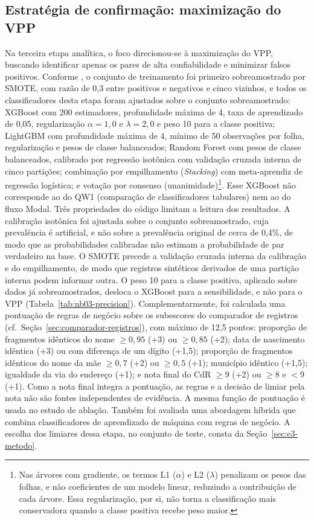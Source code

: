 \subsection{Estratégia de confirmação: maximização do VPP}\label{sec:estrategia-precisao}

Na terceira etapa analítica, o foco direcionou-se à maximização do VPP, buscando identificar apenas os pares de alta confiabilidade e minimizar falsos positivos. Conforme , o conjunto de treinamento foi primeiro sobreamostrado por SMOTE, com razão de 0,3 entre positivos e negativos e cinco vizinhos, e todos os classificadores desta etapa foram ajustados sobre o conjunto sobreamostrado: XGBoost \cite{Chen2016xgboost} com 200 estimadores, profundidade máxima de 4, taxa de aprendizado de 0,05, regularização $\alpha=1{,}0$ e $\lambda=2{,}0$ e peso 10 para a classe positiva; LightGBM \cite{Ke2017lightgbm} com profundidade máxima de 4, mínimo de 50 observações por folha, regularização e pesos de classe balanceados; Random Forest com pesos de classe balanceados, calibrado por regressão isotônica com validação cruzada interna de cinco partições; combinação por empilhamento (\textit{Stacking}) com meta-aprendiz de regressão logística; e votação por consenso (unanimidade)\footnote{Nas árvores com gradiente, os termos L1 ($\alpha$) e L2 ($\lambda$) penalizam os pesos das folhas, e não coeficientes de um modelo linear, reduzindo a contribuição de cada árvore. Essa regularização, por si, não torna a classificação mais conservadora quando a classe positiva recebe peso maior.}. Esse XGBoost não corresponde ao do QW1 (comparação de classificadores tabulares) nem ao do fluxo Modal. Três propriedades do código limitam a leitura dos resultados. A calibração isotônica foi ajustada sobre o conjunto sobreamostrado, cuja prevalência é artificial, e não sobre a prevalência original de cerca de 0,4\%, de modo que as probabilidades calibradas não estimam a probabilidade de par verdadeiro na base. O SMOTE precede a validação cruzada interna da calibração e do empilhamento, de modo que registros sintéticos derivados de uma partição interna podem informar outra. O peso 10 para a classe positiva, aplicado sobre dados já sobreamostrados, desloca o XGBoost para a sensibilidade, e não para o VPP (Tabela~\ref{tab:nb03-precision}). Complementarmente, foi calculada uma pontuação de regras de negócio sobre os subescores do comparador de registros (cf.\ Seção~\ref{sec:comparador-registros}), com máximo de 12,5 pontos: proporção de fragmentos idênticos do nome $\geq 0{,}95$ (+3) ou $\geq 0{,}85$ (+2); data de nascimento idêntica (+3) ou com diferença de um dígito (+1,5); proporção de fragmentos idênticos do nome da mãe $\geq 0{,}7$ (+2) ou $\geq 0{,}5$ (+1); município idêntico (+1,5); igualdade da via do endereço (+1); e nota final do CdR $\geq 9$ (+2) ou $\geq 8$ e $< 9$ (+1). Como a nota final integra a pontuação, as regras e a decisão de limiar pela nota não são fontes independentes de evidência. A mesma função de pontuação é usada no estudo de ablação. Também foi avaliada uma abordagem híbrida que combina classificadores de aprendizado de máquina com regras de negócio. A escolha dos limiares dessa etapa, no conjunto de teste, consta da Seção~\ref{sec:e3-metodo}.

